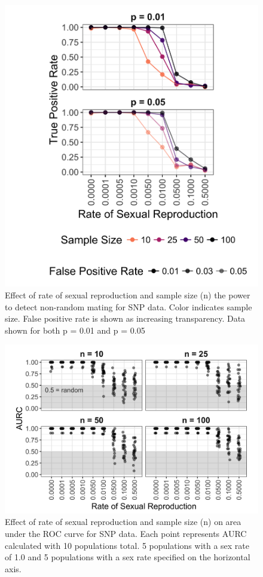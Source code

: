 \documentclass[double,11pt]{beavtex}
\begin{document}
  \begin{figure}
  
  {\centering \includegraphics[width=0.8\linewidth]{figure/simulations/genomic_power} 
  
  }
  
  \caption[Effect of rate of sexual reproduction and sample size the power to 
  detect non-random mating for SNP data. Color indicates sample size.]{Effect of rate of sexual reproduction and sample size (n) the power to 
  detect non-random mating for SNP data. Color indicates sample size. False
  positive rate is shown as increasing transparency. Data shown for both p = 0.01
  and p = 0.05}\label{fig:sim6}
  \end{figure}
  
  \begin{figure}
  
  {\centering \includegraphics[width=0.8\linewidth]{figure/simulations/AURC_genomic} 
  
  }
  
  \caption[Effect of rate of sexual reproduction and sample size on area under 
  the ROC curve for SNP data.]{Effect of rate of sexual reproduction and sample size (n) on area under 
  the ROC curve for SNP data. Each point represents AURC calculated with 10 
  populations total. 5 populations with a sex rate of 1.0 and 5 populations with a 
  sex rate specified on the horizontal axis.}\label{fig:sim7}
  \end{figure}
  
\end{document}
